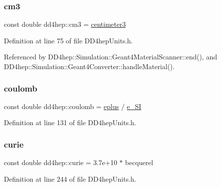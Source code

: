 \subsubsection{\texorpdfstring{cm3}{cm3}}
{\footnotesize\ttfamily const double dd4hep\+::cm3 = \hyperlink{namespacedd4hep_a5d565a155d7d3b225e52dc0b97c8186d}{centimeter3}\hspace{0.3cm}{\ttfamily [static]}}



Definition at line 75 of file D\+D4hep\+Units.\+h.



Referenced by D\+D4hep\+::\+Simulation\+::\+Geant4\+Material\+Scanner\+::end(), and D\+D4hep\+::\+Simulation\+::\+Geant4\+Converter\+::handle\+Material().

\hypertarget{namespacedd4hep_a399f2340c615066766d822ce9c9781b7}{}\label{namespacedd4hep_a399f2340c615066766d822ce9c9781b7} 
\subsubsection{\texorpdfstring{coulomb}{coulomb}}
{\footnotesize\ttfamily const double dd4hep\+::coulomb = \hyperlink{namespacedd4hep_a96ccff254b6dcebf179c3630f6205857}{eplus} / \hyperlink{namespacedd4hep_a18365e1a8b0f1730924219e336e11e9f}{e\+\_\+\+SI}\hspace{0.3cm}{\ttfamily [static]}}



Definition at line 131 of file D\+D4hep\+Units.\+h.

\hypertarget{namespacedd4hep_a024c7af7439282d20567717fbdae08bb}{}\label{namespacedd4hep_a024c7af7439282d20567717fbdae08bb} 
\subsubsection{\texorpdfstring{curie}{curie}}
{\footnotesize\ttfamily const double dd4hep\+::curie = 3.\+7e+10 $\ast$ becquerel\hspace{0.3cm}{\ttfamily [static]}}



Definition at line 244 of file D\+D4hep\+Units.\+h.

\hypertarget{namespacedd4hep_a0601e2b88f6f0cccb407192156174957}{}\label{namespacedd4hep_a0601e2b88f6f0cccb407192156174957} 
